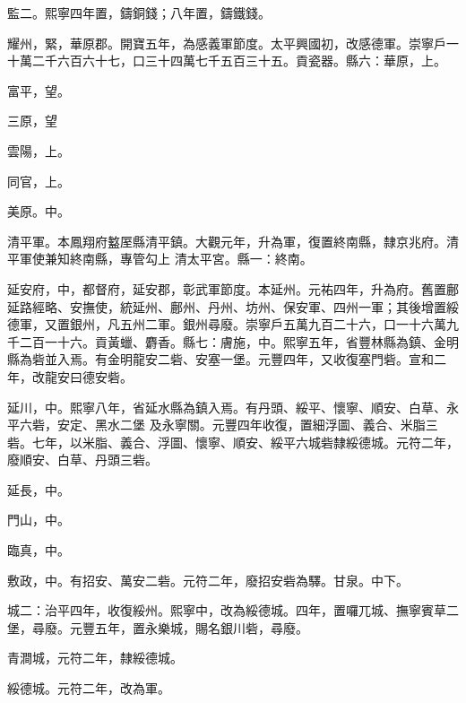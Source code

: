 \begin{pinyinscope}
 監二。熙寧四年置，鑄銅錢；八年置，鑄鐵錢。



 耀州，緊，華原郡。開寶五年，為感義軍節度。太平興國初，改感德軍。崇寧戶一十萬二千六百六十七，口三十四萬七千五百三十五。貢瓷器。縣六：華原，上。



 富平，望。



 三原，望



 雲陽，上。



 同官，上。



 美原。中。



 清平軍。本鳳翔府盭厔縣清平鎮。大觀元年，升為軍，復置終南縣，隸京兆府。清平軍使兼知終南縣，專管勾上
 清太平宮。縣一：終南。



 延安府，中，都督府，延安郡，彰武軍節度。本延州。元祐四年，升為府。舊置鄜延路經略、安撫使，統延州、鄜州、丹州、坊州、保安軍、四州一軍；其後增置綏德軍，又置銀州，凡五州二軍。銀州尋廢。崇寧戶五萬九百二十六，口一十六萬九千二百一十六。貢黃蠟、麝香。縣七：膚施，中。熙寧五年，省豐林縣為鎮、金明縣為砦並入焉。有金明龍安二砦、安塞一堡。元豐四年，又收復塞門砦。宣和二年，改龍安曰德安砦。



 延川，中。熙寧八年，省延水縣為鎮入焉。有丹頭、綏平、懷寧、順安、白草、永平六砦，安定、黑水二堡
 及永寧關。元豐四年收復，置細浮圖、義合、米脂三砦。七年，以米脂、義合、浮圖、懷寧、順安、綏平六城砦隸綏德城。元符二年，廢順安、白草、丹頭三砦。



 延長，中。



 門山，中。



 臨真，中。



 敷政，中。有招安、萬安二砦。元符二年，廢招安砦為驛。甘泉。中下。



 城二：治平四年，收復綏州。熙寧中，改為綏德城。四年，置囉兀城、撫寧賓草二堡，尋廢。元豐五年，置永樂城，賜名銀川砦，尋廢。



 青澗城，元符二年，隸綏德城。



 綏德城。元符二年，改為軍。




\end{pinyinscope}
